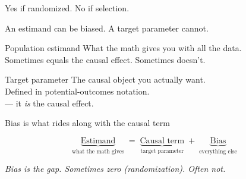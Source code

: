 \documentclass[aspectratio=169,11pt]{beamer}
\begin{document}
\begin{frame}{Yes if randomized. No if selection.}
\vspace{0.6em}
\begin{center}
\end{center}
\end{frame}

\begin{frame}{An estimand can be biased. A target parameter cannot.}
\vspace{0.5em}
\begin{block}{Population estimand}
What the math gives you with all the data. \\
Sometimes equals the causal effect. Sometimes doesn't.
\end{block}
\vspace{-0.5em}
\begin{alertblock}{Target parameter}
The causal object you actually want. \\
Defined in potential-outcomes notation. \\
 --- it \textit{is} the causal effect.
\end{alertblock}
\end{frame}

\begin{frame}{Bias is what rides along with the causal term}
\vspace{1.5em}
\begin{center}
\large
\[
\underbrace{\text{Estimand}}_{\text{what the math gives}} \;=\; \underbrace{\text{Causal term}}_{\text{target parameter}} \;+\; \underbrace{\text{Bias}}_{\text{everything else}}
\]
\end{center}
\vspace{1.5em}
\begin{center}
\small\color{warmgray}\itshape
Bias is the gap. Sometimes zero (randomization). Often not.
\end{center}
\end{frame}
\end{document}
